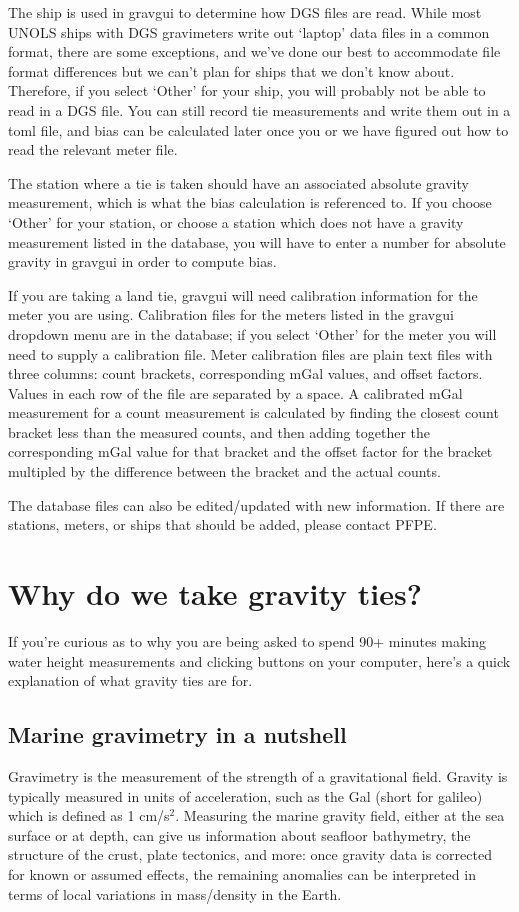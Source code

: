 \documentclass{pfpe-manual}
\begin{document}
The ship is used in gravgui to determine how DGS files are read. While most UNOLS ships with DGS gravimeters write out `laptop' data files in a common format, there are some exceptions, and we've done our best to accommodate file format differences but we can't plan for ships that we don't know about. Therefore, if you select `Other' for your ship, you will probably not be able to read in a DGS file. You can still record tie measurements and write them out in a toml file, and bias can be calculated later once you or we have figured out how to read the relevant meter file.

The station where a tie is taken should have an associated absolute gravity measurement, which is what the bias calculation is referenced to. If you choose `Other' for your station, or choose a station which does not have a gravity measurement listed in the database, you will have to enter a number for absolute gravity in gravgui in order to compute bias.

If you are taking a land tie, gravgui will need calibration information for the meter you are using. Calibration files for the meters listed in the gravgui dropdown menu are in the database; if you select `Other' for the meter you will need to supply a calibration file. Meter calibration files are plain text files with three columns: count brackets, corresponding mGal values, and offset factors. Values in each row of the file are separated by a space. A calibrated mGal measurement for a count measurement is calculated by finding the closest count bracket less than the measured counts, and then adding together the corresponding mGal value for that bracket and the offset factor for the bracket multipled by the difference between the bracket and the actual counts.

The database files can also be edited/updated with new information. If there are stations, meters, or ships that should be added, please contact PFPE.

\section{Why do we take gravity ties?}
If you're curious as to why you are being asked to spend 90+ minutes making water height measurements and clicking buttons on your computer, here's a quick explanation of what gravity ties are for.

\subsection{Marine gravimetry in a nutshell}
Gravimetry is the measurement of the strength of a gravitational field. Gravity is typically measured in units of acceleration, such as the Gal (short for galileo) which is defined as 1 cm/s$^2$. Measuring the marine gravity field, either at the sea surface or at depth, can give us information about seafloor bathymetry, the structure of the crust, plate tectonics, and more: once gravity data is corrected for known or assumed effects, the remaining anomalies can be interpreted in terms of local variations in mass/density in the Earth.
\end{document}
